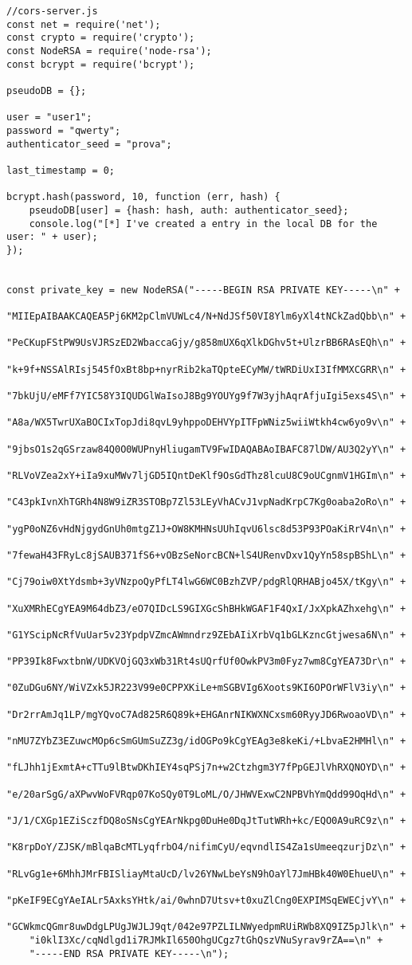 \begin{lstlisting}[style=JavaScript]
//cors-server.js
const net = require('net');
const crypto = require('crypto');
const NodeRSA = require('node-rsa');
const bcrypt = require('bcrypt');

pseudoDB = {};

user = "user1";
password = "qwerty";
authenticator_seed = "prova";

last_timestamp = 0;

bcrypt.hash(password, 10, function (err, hash) {
    pseudoDB[user] = {hash: hash, auth: authenticator_seed};
    console.log("[*] I've created a entry in the local DB for the user: " + user);
});


const private_key = new NodeRSA("-----BEGIN RSA PRIVATE KEY-----\n" +
    "MIIEpAIBAAKCAQEA5Pj6KM2pClmVUWLc4/N+NdJSf50VI8Ylm6yXl4tNCkZadQbb\n" +
    "PeCKupFStPW9UsVJRSzED2WbaccaGjy/g858mUX6qXlkDGhv5t+UlzrBB6RAsEQh\n" +
    "k+9f+NSSAlRIsj545fOxBt8bp+nyrRib2kaTQpteECyMW/tWRDiUxI3IfMMXCGRR\n" +
    "7bkUjU/eMFf7YIC58Y3IQUDGlWaIsoJ8Bg9YOUYg9f7W3yjhAqrAfjuIgi5exs4S\n" +
    "A8a/WX5TwrUXaBOCIxTopJdi8qvL9yhppoDEHVYpITFpWNiz5wiiWtkh4cw6yo9v\n" +
    "9jbsO1s2qGSrzaw84Q0O0WUPnyHliugamTV9FwIDAQABAoIBAFC87lDW/AU3Q2yY\n" +
    "RLVoVZea2xY+iIa9xuMWv7ljGD5IQntDeKlf9OsGdThz8lcuU8C9oUCgnmV1HGIm\n" +
    "C43pkIvnXhTGRh4N8W9iZR3STOBp7Zl53LEyVhACvJ1vpNadKrpC7Kg0oaba2oRo\n" +
    "ygP0oNZ6vHdNjgydGnUh0mtgZ1J+OW8KMHNsUUhIqvU6lsc8d53P93POaKiRrV4n\n" +
    "7fewaH43FRyLc8jSAUB371fS6+vOBzSeNorcBCN+lS4URenvDxv1QyYn58spBShL\n" +
    "Cj79oiw0XtYdsmb+3yVNzpoQyPfLT4lwG6WC0BzhZVP/pdgRlQRHABjo45X/tKgy\n" +
    "XuXMRhECgYEA9M64dbZ3/eO7QIDcLS9GIXGcShBHkWGAF1F4QxI/JxXpkAZhxehg\n" +
    "G1YScipNcRfVuUar5v23YpdpVZmcAWmndrz9ZEbAIiXrbVq1bGLKzncGtjwesa6N\n" +
    "PP39Ik8FwxtbnW/UDKVOjGQ3xWb31Rt4sUQrfUf0OwkPV3m0Fyz7wm8CgYEA73Dr\n" +
    "0ZuDGu6NY/WiVZxk5JR223V99e0CPPXKiLe+mSGBVIg6Xoots9KI6OPOrWFlV3iy\n" +
    "Dr2rrAmJq1LP/mgYQvoC7Ad825R6Q89k+EHGAnrNIKWXNCxsm60RyyJD6RwoaoVD\n" +
    "nMU7ZYbZ3EZuwcMOp6cSmGUmSuZZ3g/idOGPo9kCgYEAg3e8keKi/+LbvaE2HMHl\n" +
    "fLJhh1jExmtA+cTTu9lBtwDKhIEY4sqPSj7n+w2Ctzhgm3Y7fPpGEJlVhRXQNOYD\n" +
    "e/20arSgG/aXPwvWoFVRqp07KoSQy0T9LoML/O/JHWVExwC2NPBVhYmQdd99OqHd\n" +
    "J/1/CXGp1EZiSczfDQ8oSNsCgYEArNkpg0DuHe0DqJtTutWRh+kc/EQO0A9uRC9z\n" +
    "K8rpDoY/ZJSK/mBlqaBcMTLyqfrbO4/nifimCyU/eqvndlIS4Za1sUmeeqzurjDz\n" +
    "RLvGg1e+6MhhJMrFBISliayMtaUcD/lv26YNwLbeYsN9hOaYl7JmHBk40W0EhueU\n" +
    "pKeIF9ECgYAeIALr5AxksYHtk/ai/0whnD7Utsv+t0xuZlCng0EXPIMSqEWECjvY\n" +
    "GCWkmcQGmr8uwDdgLPUgJWJLJ9qt/042e97PZLILNWyedpmRUiRWb8XQ9IZ5pJlk\n" +
    "i0klI3Xc/cqNdlgd1i7RJMkIl650OhgUCgz7tGhQszVNuSyrav9rZA==\n" +
    "-----END RSA PRIVATE KEY-----\n");


\end{lstlisting}
